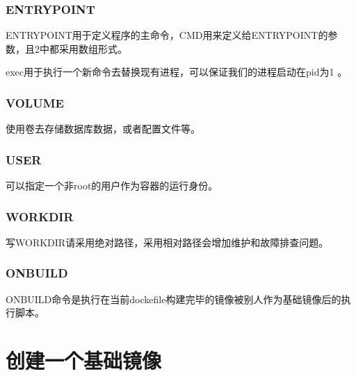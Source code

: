 \documentclass[letterpaper,10pt,english]{sphinxmanual}
\begin{document}
\subsection{ENTRYPOINT}
\label{\detokenize{_u8fd0_u884c_u5e94_u7528/02-dockerfile_u7f16_u5199_u6700_u4f73_u5b9e_u8df5:entrypoint}}
ENTRYPOINT用于定义程序的主命令，CMD用来定义给ENTRYPOINT的参数，且2中都采用数组形式。

exec用于执行一个新命令去替换现有进程，可以保证我们的进程启动在pid为1 。


\subsection{VOLUME}
\label{\detokenize{_u8fd0_u884c_u5e94_u7528/02-dockerfile_u7f16_u5199_u6700_u4f73_u5b9e_u8df5:volume}}
使用卷去存储数据库数据，或者配置文件等。


\subsection{USER}
\label{\detokenize{_u8fd0_u884c_u5e94_u7528/02-dockerfile_u7f16_u5199_u6700_u4f73_u5b9e_u8df5:user}}
可以指定一个非root的用户作为容器的运行身份。


\subsection{WORKDIR}
\label{\detokenize{_u8fd0_u884c_u5e94_u7528/02-dockerfile_u7f16_u5199_u6700_u4f73_u5b9e_u8df5:workdir}}
写WORKDIR请采用绝对路径，采用相对路径会增加维护和故障排查问题。


\subsection{ONBUILD}
\label{\detokenize{_u8fd0_u884c_u5e94_u7528/02-dockerfile_u7f16_u5199_u6700_u4f73_u5b9e_u8df5:onbuild}}
ONBUILD命令是执行在当前dockefile构建完毕的镜像被别人作为基础镜像后的执行脚本。


\chapter{创建一个基础镜像}
\label{\detokenize{_u8fd0_u884c_u5e94_u7528/03-_u521b_u5efa_u4e00_u4e2a_u57fa_u7840_u955c_u50cf::doc}}\label{\detokenize{_u8fd0_u884c_u5e94_u7528/03-_u521b_u5efa_u4e00_u4e2a_u57fa_u7840_u955c_u50cf:id1}}
\end{document}
